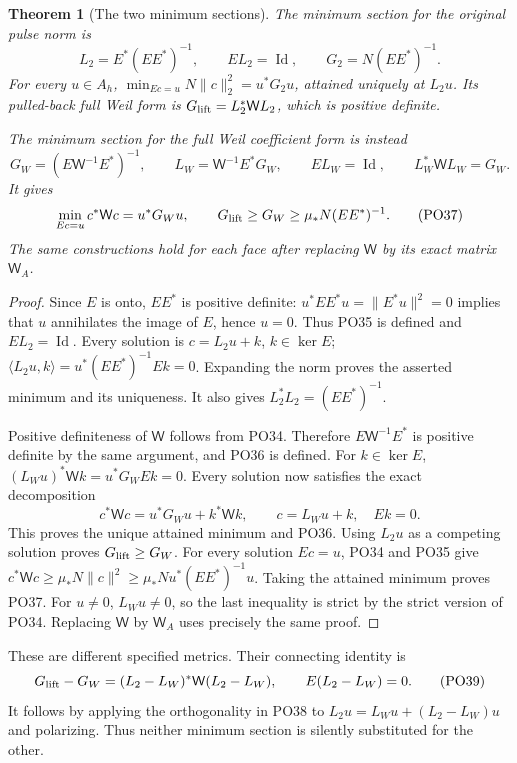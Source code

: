 \documentclass[11pt]{article}
\newtheorem{theorem}{Theorem}[section]
\newcommand{\Id}{\operatorname{Id}}
\begin{document}
\begin{theorem}[The two minimum sections]\label{thm:minima}
The minimum section for the original pulse norm is
\[
 L_2=E^*(EE^*)^{-1},\qquad
 EL_2=\Id,\qquad
 G_2=N(EE^*)^{-1}.
 \tag{PO35}\label{po:L2}
\]
For every \(u\in A_h\),
\(\min_{Ec=u}N\|c\|_2^2=u^*G_2u\), attained uniquely at \(L_2u\).
Its pulled-back full Weil form is
\(G_{\rm lift}=L_2^*\mathsf W L_2\), which is positive definite.

The minimum section for the full Weil coefficient form is instead
\[
 G_W=(E\mathsf W^{-1}E^*)^{-1},\qquad
 L_W=\mathsf W^{-1}E^*G_W,\qquad
 EL_W=\Id,\qquad L_W^*\mathsf W L_W=G_W .
 \tag{PO36}\label{po:LW}
\]
It gives
\[
 \min_{Ec=u}c^*\mathsf Wc=u^*G_Wu,\qquad
 G_{\rm lift}\ge G_W\ge\mu_*N(EE^*)^{-1}.
 \tag{PO37}\label{po:metrics}
\]
The same constructions hold for each face after replacing
\(\mathsf W\) by its exact matrix \(\mathsf W_A\).
\end{theorem}
\begin{proof}
Since \(E\) is onto, \(EE^*\) is positive definite:
\(u^*EE^*u=\|E^*u\|^2=0\) implies that \(u\) annihilates
the image of \(E\), hence \(u=0\).
Thus PO35 is defined and \(EL_2=\Id\).
Every solution is \(c=L_2u+k\), \(k\in\ker E\);
\(\langle L_2u,k\rangle=u^*(EE^*)^{-1}Ek=0\).
Expanding the norm proves the asserted minimum and its uniqueness.
It also gives \(L_2^*L_2=(EE^*)^{-1}\).

Positive definiteness of \(\mathsf W\) follows from PO34.
Therefore \(E\mathsf W^{-1}E^*\) is positive definite by
the same argument, and PO36 is defined.
For \(k\in\ker E\),
\((L_Wu)^*\mathsf Wk=u^*G_WEk=0\).
Every solution now satisfies the exact decomposition
\[
 c^*\mathsf Wc
   =u^*G_Wu+k^*\mathsf Wk,\qquad c=L_Wu+k,\quad Ek=0.
 \tag{PO38}\label{po:minimum-decomp}
\]
This proves the unique attained minimum and PO36.
Using \(L_2u\) as a competing solution proves
\(G_{\rm lift}\ge G_W\). For every solution \(Ec=u\),
PO34 and PO35 give
\(c^*\mathsf Wc\ge\mu_*N\|c\|^2
\ge\mu_*N u^*(EE^*)^{-1}u\).
Taking the attained minimum proves PO37.
For \(u\ne0\), \(L_Wu\ne0\), so the last inequality is
strict by the strict version of PO34.
Replacing \(\mathsf W\) by \(\mathsf W_A\) uses precisely
the same proof.
\end{proof}

These are different specified metrics. Their connecting identity is
\[
 G_{\rm lift}-G_W
  =(L_2-L_W)^*\mathsf W(L_2-L_W),\qquad
 E(L_2-L_W)=0 .
 \tag{PO39}\label{po:metric-difference}
\]
It follows by applying the orthogonality in PO38 to
\(L_2u=L_Wu+(L_2-L_W)u\) and polarizing.
Thus neither minimum section is silently substituted for the other.
\end{document}
